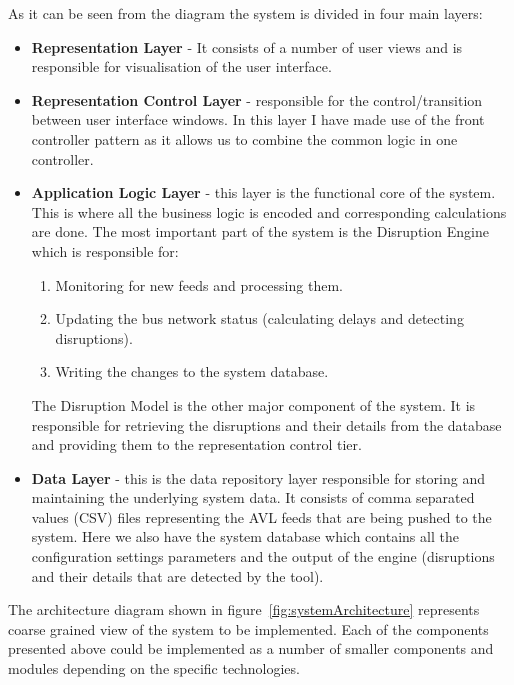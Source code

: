 As it can be seen from the diagram the system is divided in four main layers:
\begin{itemize}
	\item \textbf{Representation Layer} - It consists of a number of user views and is responsible for visualisation of the user interface. 
	\item \textbf{Representation  Control Layer} - responsible for the control/transition between user interface windows. In this layer I have made use of the front controller pattern \cite{fowler2003patterns} as it allows us to combine the common logic in one controller.
	\item \textbf{Application Logic Layer} -  this layer is the functional core of the system. This is where all the business logic is encoded and corresponding calculations are done. The most important part of the system is the Disruption Engine which is responsible for:
	\begin{enumerate}
		\item Monitoring for new feeds and processing them.
		\item Updating the bus network status (calculating delays and detecting disruptions).
		\item Writing the changes to the system database.
	\end{enumerate}
	The Disruption Model is the other major component of the system. It is responsible for retrieving the disruptions and their details from the database and providing them to the representation control tier.
	\item \textbf{Data Layer} - this is the data repository layer responsible for storing and maintaining the underlying system data. It consists of comma separated values (CSV) files representing the AVL feeds that are being pushed to the system. Here we also have the system database which contains all the configuration settings parameters and the output of the engine (disruptions and their details that are detected by the tool).
\end{itemize}
The architecture diagram shown in figure~\ref{fig:systemArchitecture} represents coarse grained view of the system to be implemented. Each of the components presented above could be implemented as a number of smaller components and modules depending on the specific technologies.

